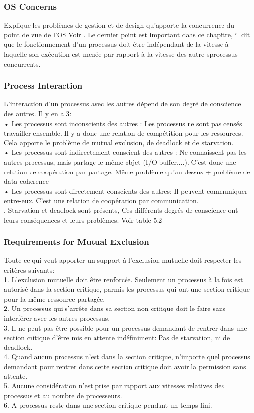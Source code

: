 \subsubsection{OS Concerns}
Explique les problèmes de gestion et de design qu'apporte la concurrence du point de vue de l'OS Voir \cite[p.~224]{stallings}. Le dernier point est important dans ce chapitre, il dit que le fonctionnement d'un processus doit être indépendant de la vitesse à laquelle son exécution est menée par rapport à la vitesse des autre sprocessus concurrents.
\subsubsection{Process Interaction}
L'interaction d'un processus avec les autres dépend de son degré de conscience des autres. Il y en a 3: \\
• Les processus sont inconscients des autres : Les processus ne sont pas censés travailler ensemble. Il y a donc une relation de compétition pour les ressources. Cela apporte le problème de mutual exclusion, de deadlock et de starvation. \\
• Les processus sont indirectement conscient des autres : Ne connaissent pas les autres processus, mais partage le même objet (I/O buffer,...). C'est donc une relation de coopération par partage. Même problème qu'au dessus + problème de data coherence \\
• Les processus sont directement conscients des autres: Il peuvent communiquer entre-eux. C'est une relation de coopération par communication. \\
. Starvation et deadlock sont présents, Ces différents degrés de conscience ont leurs conséquences et leurs problèmes. Voir table 5.2 \cite[p.~225]{stallings}
\subsubsection{Requirements for Mutual Exclusion}
Toute ce qui veut apporter un support à l'exclusion mutuelle doit respecter les critères suivants: \\
1. L'exclusion mutuelle doit être renforcée. Seulement un processus à la fois est autorisé dans la section critique, parmis les processus qui ont une section critique pour la même ressource partagée. \\
2. Un processus qui s'arrête dans sa section non critique doit le faire sans interférer avec les autres processus. \\
3. Il ne peut pas être possible pour un processus demandant de rentrer dans une section critique d'être mis en attente indéfiniment: Pas de starvation, ni de deadlock. \\
4. Quand aucun processus n'est dans la section critique, n'importe quel processus demandant pour rentrer dans cette section critique doit avoir la permission sans attente. \\
5. Aucune considération n'est prise par rapport aux vitesses relatives des processus et au nombre de processeurs. \\
6. A processus reste dans une section critique pendant un temps fini. \\

